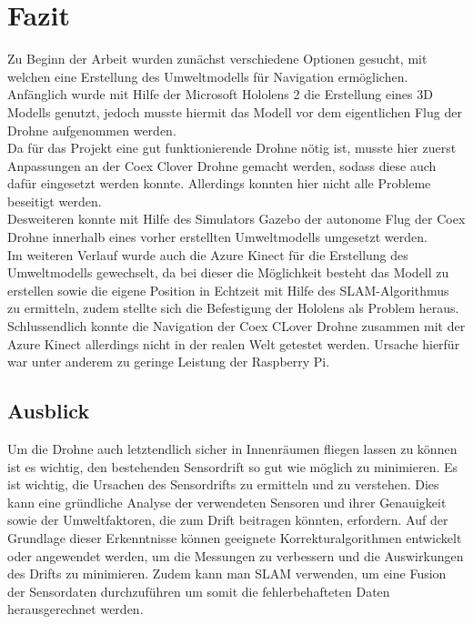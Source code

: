 \chapter{Fazit}
Zu Beginn der Arbeit wurden zunächst verschiedene Optionen gesucht, mit welchen eine Erstellung des Umweltmodells für Navigation ermöglichen. Anfänglich wurde mit Hilfe der Microsoft Hololens 2 die Erstellung eines 3D Modells genutzt, jedoch musste hiermit das Modell vor dem eigentlichen Flug der Drohne aufgenommen werden. \\
Da für das Projekt eine gut funktionierende Drohne nötig ist, musste hier zuerst Anpassungen an der Coex Clover Drohne gemacht werden, sodass diese auch dafür eingesetzt werden konnte. Allerdings konnten hier nicht alle Probleme beseitigt werden.\\ 
Desweiteren konnte mit Hilfe des Simulators Gazebo der autonome Flug der Coex Drohne innerhalb eines vorher erstellten Umweltmodells umgesetzt werden. \\
Im weiteren Verlauf wurde auch die Azure Kinect für die Erstellung des Umweltmodells gewechselt, da bei dieser die Möglichkeit besteht das Modell zu erstellen sowie die eigene Position in Echtzeit mit Hilfe des SLAM-Algorithmus zu ermitteln, zudem stellte sich die Befestigung der Hololens als Problem heraus. \\ 
Schlussendlich konnte die Navigation der Coex CLover Drohne zusammen mit der Azure Kinect allerdings nicht in der realen Welt getestet werden. Ursache hierfür war unter anderem zu geringe Leistung der Raspberry Pi.




\section{Ausblick}
Um die Drohne auch letztendlich sicher in Innenräumen fliegen lassen zu können ist es wichtig, den bestehenden Sensordrift so gut wie möglich zu minimieren. Es ist wichtig, die Ursachen des Sensordrifts zu ermitteln und zu verstehen. Dies kann eine gründliche Analyse der verwendeten Sensoren und ihrer Genauigkeit sowie der Umweltfaktoren, die zum Drift beitragen könnten, erfordern. Auf der Grundlage dieser Erkenntnisse können geeignete Korrekturalgorithmen entwickelt oder angewendet werden, um die Messungen zu verbessern und die Auswirkungen des Drifts zu minimieren. Zudem kann man SLAM verwenden, um eine Fusion der Sensordaten durchzuführen um somit die fehlerbehafteten Daten herausgerechnet werden. 

